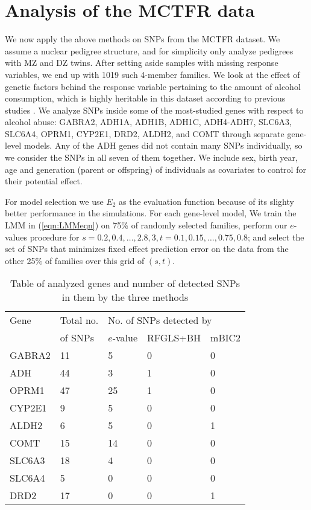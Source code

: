 \section{Analysis of the MCTFR data}
\label{sec:DataSection}

We now apply the above methods on SNPs from the MCTFR dataset. We assume a nuclear pedigree structure, and for simplicity only analyze pedigrees with MZ and DZ twins. After setting aside samples with missing response variables, we end up with 1019 such 4-member families. We look at the effect of genetic factors behind the response variable pertaining to the amount of alcohol consumption, which is highly heritable in this dataset according to previous studies \citep{McGueEtal13}. We analyze SNPs inside some of the most-studied genes with respect to alcohol abuse: GABRA2, ADH1A, ADH1B, ADH1C, ADH4-ADH7, SLC6A3, SLC6A4, OPRM1, CYP2E1, DRD2, ALDH2, and COMT \citep{CoombesThesis16} through separate gene-level models. Any of the ADH genes did not contain many SNPs individually, so we consider the SNPs in all seven of them together. We include sex, birth year, age and generation (parent or offspring) of individuals as covariates to control for their potential effect.

For model selection we use $E_2$ as the evaluation function because of its slighty better performance in the simulations. For each gene-level model, We train the LMM in (\ref{eqn:LMMeqn}) on 75\% of randomly selected families, perform our $e$-values procedure for $s = 0.2, 0.4, \ldots, 2.8, 3, t = 0.1, 0.15, \ldots, 0.75, 0.8$; and select the set of SNPs that minimizes fixed effect prediction error on the data from the other 25\% of families over this grid of $(s,t)$.  

\begin{table}
    \begin{tabular}{l|l|lll}
    \hline
    Gene   & Total no. & \multicolumn{3}{l}{No. of SNPs detected by }\\\cline{3-5}
    & of SNPs & $e$-value & RFGLS+BH & mBIC2 \\\hline
    GABRA2 & 11        & 5       & 0     & 0     \\
    ADH    & 44        & 3       & 1     & 0     \\
    OPRM1  & 47        & 25      & 1     & 0     \\
    CYP2E1 & 9         & 5       & 0     & 0     \\
    ALDH2  & 6         & 5       & 0     & 1     \\
    COMT   & 15        & 14      & 0     & 0     \\
    SLC6A3 & 18        & 4       & 0     & 0     \\
    SLC6A4 & 5         & 0       & 0     & 0     \\
    DRD2   & 17        & 0       & 0     & 1     \\\hline
    \end{tabular}
    \caption{Table of analyzed genes and number of detected SNPs in them by the three methods}
    \label{table:genetable}
\end{table}

